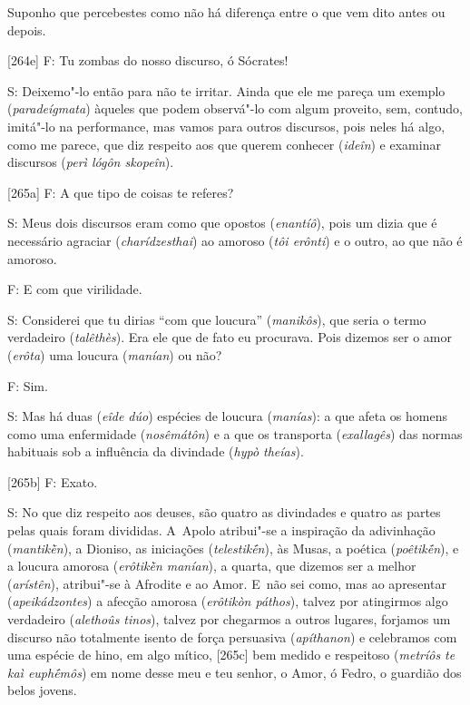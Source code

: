  

Suponho que percebestes como não há diferença entre o que vem dito antes
ou depois.

 

[264e] F: Tu zombas do nosso discurso, ó Sócrates!

 

S: Deixemo"-lo então para não te irritar. Ainda que ele me pareça um
exemplo (\emph{paradeígmata}) àqueles que podem observá"-lo com algum
proveito, sem, contudo, imitá"-lo na performance, mas vamos para outros
discursos, pois neles há algo, como me parece, que diz respeito aos que
querem conhecer (\emph{ideîn}) e examinar discursos (\emph{perì lógôn
skopeîn}).

 

[265a] F: A que tipo de coisas te referes?

 

S: Meus dois discursos eram como que opostos (\emph{enantíô}), pois um
dizia que é necessário agraciar (\emph{charídzesthai}) ao amoroso
(\emph{tôi erônti}) e o outro, ao que não é amoroso.

 

F: E com que virilidade.

 

S: Considerei que tu dirias ``com que loucura'' (\emph{manikôs}), que
seria o termo verdadeiro (\emph{talêthès}). Era ele que de fato eu
procurava. Pois dizemos ser o amor (\emph{erôta}) uma loucura
(\emph{manían}) ou não?

 

F: Sim.

 

S: Mas há duas (\emph{eîde dúo}) espécies de loucura (\emph{manías}): a
que afeta os homens como uma enfermidade (\emph{nosêmátôn}) e a que os
transporta (\emph{exallagês}) das normas habituais sob a influência da
divindade (\emph{hypò theías}).

 

[265b] F: Exato.

 

S: No que diz respeito aos deuses, são quatro as divindades e quatro as
partes pelas quais foram divididas. A~Apolo atribui"-se a inspiração da
adivinhação (\emph{mantikḕn}), a Dioniso, as iniciações
(\emph{telestikḗn}), às Musas, a poética (\emph{poêtikḗn}), e a loucura
amorosa (\emph{erôtikḕn manían}), a quarta, que dizemos ser a melhor
(\emph{arístên}), atribui"-se à Afrodite e ao Amor. E~não sei como, mas
ao apresentar (\emph{apeikádzontes}) a afecção amorosa (\emph{erôtikòn
páthos}), talvez por atingirmos algo verdadeiro (\emph{alethoûs tinos}),
talvez por chegarmos a outros lugares, forjamos um discurso não
totalmente isento de força persuasiva (\emph{apíthanon}) e celebramos
com uma espécie de hino, em algo mítico, [265c] bem medido e
respeitoso (\emph{metríôs te kaì euphḗmôs}) em nome desse meu e teu
senhor, o Amor, ó Fedro, o guardião dos belos jovens.

